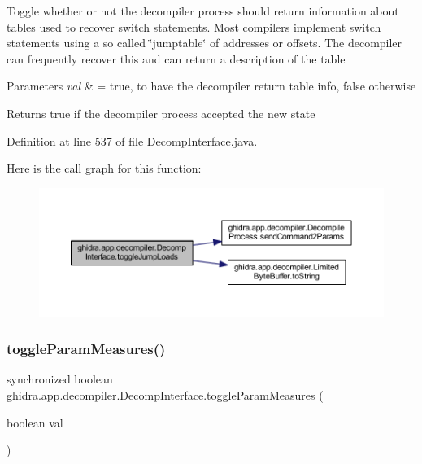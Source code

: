 Toggle whether or not the decompiler process should return information about tables used to recover switch statements. Most compilers implement switch statements using a so called \char`\"{}jumptable\char`\"{} of addresses or offsets. The decompiler can frequently recover this and can return a description of the table 
\begin{DoxyParams}{Parameters}
{\em val} & = true, to have the decompiler return table info, false otherwise \\
\hline
\end{DoxyParams}
\begin{DoxyReturn}{Returns}
true if the decompiler process accepted the new state 
\end{DoxyReturn}


Definition at line 537 of file Decomp\+Interface.\+java.

Here is the call graph for this function\+:
\nopagebreak
\begin{figure}[H]
\begin{center}
\leavevmode
\includegraphics[width=350pt]{classghidra_1_1app_1_1decompiler_1_1_decomp_interface_ae85bc75b791bef3138569cad3de61164_cgraph}
\end{center}
\end{figure}
\mbox{\label{classghidra_1_1app_1_1decompiler_1_1_decomp_interface_abb67168acc7272f70feac50007c29223}} 
\subsubsection{\texorpdfstring{toggleParamMeasures()}{toggleParamMeasures()}}
{\footnotesize\ttfamily synchronized boolean ghidra.\+app.\+decompiler.\+Decomp\+Interface.\+toggle\+Param\+Measures (\begin{DoxyParamCaption}\item[{boolean}]{val }\end{DoxyParamCaption})\hspace{0.3cm}{\ttfamily [inline]}}

